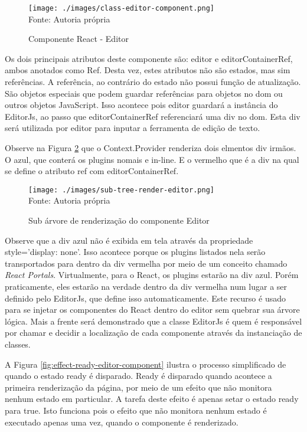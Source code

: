 \begin{figure}[H]
    \centering
    \caption{Componente React - Editor}
    \texttt{[image: ./images/class-editor-component.png]}
    \label{fig:class-editor-component} \\
    \textnormal{\fontsize{10pt}{12pt}Fonte: Autoria própria}
\end{figure}

Os dois principais atributos deste componente são: editor e editorContainerRef,
ambos anotados como Ref.
Desta vez, estes atributos não são estados, mas sim referências. A referência,
ao contrário do estado não possui função de atualização. São objetos especiais
que podem guardar referências para objetos no
\acrshort{dom}
ou outros objetos JavaScript. Isso acontece pois editor guardará a instância
do EditorJs, ao passo que editorContainerRef referenciará uma div no
\acrshort{dom}.
Esta div será utilizada por editor para inputar a ferramenta de edição de
texto.

Observe na
Figura \ref{fig:sub-tree-render-editor}
que o Context.Provider renderiza dois elmentos div irmãos. O azul, que conterá
os plugins nomais e in-line. E o vermelho que é a div na qual se define
o atributo ref com editorContainerRef.

\begin{figure}[H]
    \centering
    \caption{Sub árvore de renderização do componente Editor}
    \texttt{[image: ./images/sub-tree-render-editor.png]}
    \label{fig:sub-tree-render-editor} \\
    \textnormal{\fontsize{10pt}{12pt}Fonte: Autoria própria}
\end{figure}

Observe que a div azul não é exibida em tela através da propriedade
style='display: none'. Isso acontece porque os plugins listados
nela serão transportados para dentro da div vermelha por meio de
um conceito chamado \textit{React Portals}. Virtualmente, para o React,
os plugins estarão na div azul. Porém praticamente, eles estarão na verdade
dentro da div vermelha num lugar a ser definido pelo EditorJs, que define
isso automaticamente. Este recurso é usado para se injetar os componentes
do React dentro do editor sem quebrar sua árvore lógica. Mais a frente
será demonstrado que a classe EditorJs é quem é responsável por chamar
e decidir a localização de cada componente através da
instanciação de classes.

A
Figura \ref{fig:effect-ready-editor-component}
ilustra o processo simplificado de quando o estado ready é disparado.
Ready é disparado quando acontece a primeira renderização da página, por meio
de um efeito que não monitora nenhum estado em particular. A tarefa deste efeito
é apenas setar o estado ready para true. Isto funciona pois o efeito que
não monitora nenhum estado é executado apenas uma vez, quando o componente é
renderizado.

